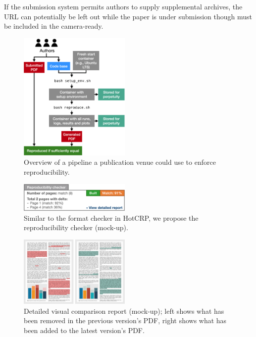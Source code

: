 \noindent If the submission system permits authors to supply supplemental archives, the URL can potentially be left out while the paper is under submission though must be included in the camera-ready.

\begin{figure}
    \includegraphics[width=0.48\textwidth]{figures/venue-reproducibility-pipeline.png}
    \caption{Overview of a pipeline a publication venue could use to enforce reproducibility.}
    \label{fig:venue-reproducibility-pipeline}
\end{figure}

\begin{figure}
    \includegraphics[width=0.48\textwidth]{figures/reproducibility-checker.png}
    \caption{Similar to the format checker in HotCRP, we propose the reproducibility checker (mock-up).}
    \label{fig:reproducibility-checker}
\end{figure}

\begin{figure}
    \includegraphics[width=0.48\textwidth]{figures/paper-pdf-delta.png}
    \caption{Detailed visual comparison report (mock-up); left shows what has been removed in the previous version's PDF, right shows what has been added to the latest version's PDF.}
    \label{fig:paper-pdf-delta}
\end{figure}

